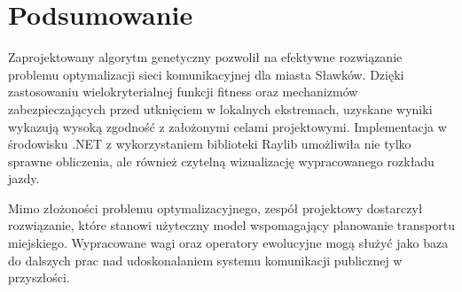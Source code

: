 \chapter{Podsumowanie}
Zaprojektowany algorytm genetyczny pozwolił na efektywne rozwiązanie problemu optymalizacji sieci komunikacyjnej dla miasta Sławków. Dzięki zastosowaniu wielokryterialnej funkcji fitness oraz mechanizmów zabezpieczających przed utknięciem w lokalnych ekstremach, uzyskane wyniki wykazują wysoką zgodność z założonymi celami projektowymi. Implementacja w środowisku .NET z wykorzystaniem biblioteki Raylib umożliwiła nie tylko sprawne obliczenia, ale również czytelną wizualizację wypracowanego rozkładu jazdy. 

Mimo złożoności problemu optymalizacyjnego, zespół projektowy dostarczył rozwiązanie, które stanowi użyteczny model wspomagający planowanie transportu miejskiego. Wypracowane wagi oraz operatory ewolucyjne mogą służyć jako baza do dalszych prac nad udoskonalaniem systemu komunikacji publicznej w przyszłości.
